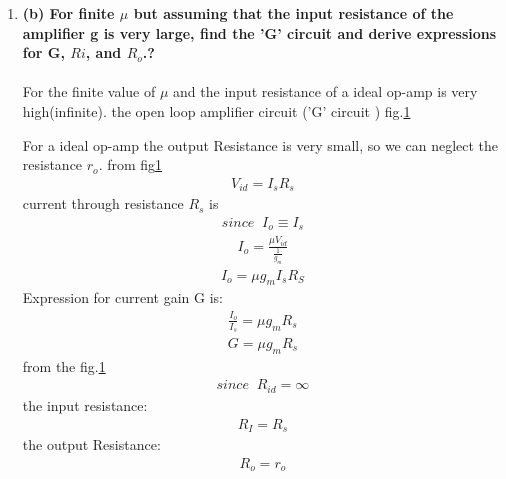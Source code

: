\begin{enumerate}[label=\thesection.\arabic*.,ref=\thesection.\theenumi]
\item
\label{Question_1b_ee18btech11023}
\textbf{
(b) For finite $\mu$ but assuming that the input resistance of the
amplifier g is very large, find the 'G' circuit and derive
expressions for G, $Ri$, and $R_o$.?}
\\
\solution\\
For the finite value of $\mu$ and the input resistance of a ideal op-amp is very high(infinite).
the open loop amplifier circuit ('G' circuit ) fig.\ref{fig:small ckt1}
\begin{figure}[!ht]
	\begin{center}
			\resizebox{\columnwidth}{!}{}
	\end{center}
\caption{}
\label{fig:small ckt1}
\end{figure}

For a ideal op-amp the output Resistance is very small, so we can neglect the resistance $r_o$.  from fig\ref{fig:small ckt1}
\begin{align}
    V_{id} = I_sR_s
    \label{eq_ee18btech11023_7}
\end{align}
current through resistance $R_s$ is
\begin{align*}
    since\;\;I_o \equiv I_s
\end{align*}
\begin{align}
    I_o = \frac{\mu V_{id}}{\frac{1}{g_m}} 
    \label{eq_ee18btech11023_8}
\end{align}
\begin{align}
    I_o = \mu g_m I_s R_S
    \label{eq_ee18btech11023_9}
\end{align}
Expression for current gain G is:
\begin{align}
    \frac{I_o}{I_s} = \mu g_m R_s
    \label{eq_ee18btech11023_10}
\end{align}
\begin{align}
    G = \mu g_m R_s
    \label{eq_ee18btech11023_11}
\end{align}
from the fig.\ref{fig:small ckt1}
\begin{align*}
    since \;\; R_{id} = \infty
\end{align*}
the input resistance:
\begin{align}
    R_I = R_s
    \label{eq_ee18btech11023_12}
\end{align}
the output Resistance:
\begin{align}
    R_o = r_o
    \label{eq_ee18btech11023_13}
\end{align}


\end{enumerate}
